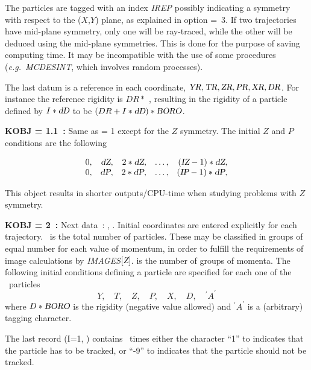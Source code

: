 \noindent The particles are tagged with an index \textsl{IREP} possibly
indicating a symmetry  with respect to the ($ X$,$Y$) plane, as explained in option 
\mbox{\KOBJ= 3}. If two trajectories have mid-plane symmetry, only one  will be 
ray-traced, while the other will be deduced using the mid-plane 
symmetries. This is done for the purpose of saving computing time. It may 
be incompatible with the use of some procedures (\emph{e.g.}~\textsl{MCDESINT}, which 
involves random processes). 

\noindent The last datum is a reference in each coordinate, $\textsl{YR},\textsl{TR},\textsl{ZR},\textsl{PR},\textsl{XR},\textsl{DR}$. 
For instance the reference rigidity is $ DR \ast$ \BORO, resulting 
 in the rigidity of a particle defined by $ I\ast \textsl{dD} $ to be 
$ (DR+I\ast \textsl{dD})\ast \textsl{BORO}$. 

\bigskip

\noindent\textbf{KOBJ = 1.1~:} Same as \KOBJ = 1    except for the $ Z $
symmetry.  The initial $ Z $ and $ P $ conditions are the following 

$$
  \begin{array}{*{5}{r<{,}}}
	  0  &  \dZ &   2  \ast   \dZ & \ldots & (\IZ-1)   \ast   \dZ \\
	  0  &  \dP &   2  \ast   \dP  & \ldots & (\IP-1)   \ast   \dP 
  \end{array}
 $$


\noindent This object results in shorter outputs/CPU-time when studying problems with $Z $ symmetry.  

\bigskip

\noindent\textbf{KOBJ = 2~:}   Next data~: \IMAX{},  
\IDMAX{}. Initial coordinates
are entered explicitly for each 
trajectory.  \IMAX\  is the total number of particles.  
These may be classified in groups of equal number for each value of momentum, in order to 
fulfill the requirements of image calculations by \textsl{IMAGES$[\textsl{Z}]$}. 
 \IDMAX{} is the 
number of groups of momenta.  The  following initial 
conditions defining a particle are specified for each one of the \IMAX\  
 particles
 $$ Y,\quad T,\quad Z,\quad P, \quad X, \quad D,\quad ^\prime A^\prime $$
%
 where $ D\ast \textsl{BORO}$ is the rigidity (negative value   
 allowed) and $ ^\prime A^\prime $ is a
(arbitrary) tagging character.   


\smallskip

\noindent The last record \IEX{} (I=1, \IMAX)  contains 
\IMAX\  times either the character  ``1'' to indicates that the particle has to  be
tracked,  or ``-9''  to indicates that the particle should not be tracked.  

